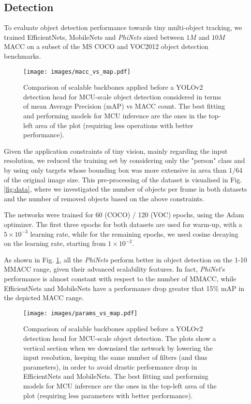 \subsection{Detection}
To evaluate object detection performance towards tiny multi-object tracking, we trained EfficientNets, MobileNets and \textit{PhiNets} sized between $1M$ and $10M$ MACC on a subset of the MS COCO \cite{lin2014microsoft} and VOC2012 \cite{pascal-voc-2012} object detection benchmarks.

\begin{figure}[h]
  \centering
  \texttt{[image: images/macc\_vs\_map.pdf]}
  \caption{Comparison of scalable backbones applied before a YOLOv2 detection head for MCU-scale object detection considered in terms of  mean Average Precision (mAP) vs MACC count. The best fitting and performing models for MCU inference are the ones in the top-left area of the plot (requiring less operations with better performance).}
  \label{fig:detresults_macc_1}
\end{figure}


Given the application constraints of tiny vision, mainly regarding the input resolution, we reduced the training set by considering only the "person" class and by using only targets whose bounding box was more extensive in area than $1/64$ of the original image size. This pre-processing of the dataset is visualised in Fig. \ref{fig:data}, where we investigated the number of objects per frame in both datasets and the number of removed objects based on the above constraints.

The networks were trained for 60 (COCO) / 120 (VOC) epochs, using the Adam optimizer. The first three epochs for both datasets are used for warm-up, with a $5\times 10^{-3}$ learning rate, while for the remaining epochs, we used cosine decaying on the learning rate, starting from $1\times 10^{-2}$.

As shown in Fig. \ref{fig:detresults_macc_1}, all the \textit{PhiNets} perform better in object detection on the 1-10 MMACC range, given their advanced scalability features. In fact, \textit{PhiNet}'s performance is almost constant with respect to the number of MMACC, while EfficientNets and MobileNets have a performance drop greater that 15\% mAP in the depicted MACC range.

\begin{figure}[htbp]
  \centering
  \texttt{[image: images/params\_vs\_map.pdf]}
  \caption{Comparison of scalable backbones applied before a YOLOv2 detection head for MCU-scale object detection. The plots show a vertical section when we downsized the network by lowering the input resolution, keeping the same number of filters (and thus parameters), in order to avoid drastic performance drop in EfficientNets and MobileNets. The best fitting and performing models for MCU inference are the ones in the top-left area of the plot (requiring less parameters with better performance).}
  \label{fig:detresults_params}
\end{figure}

